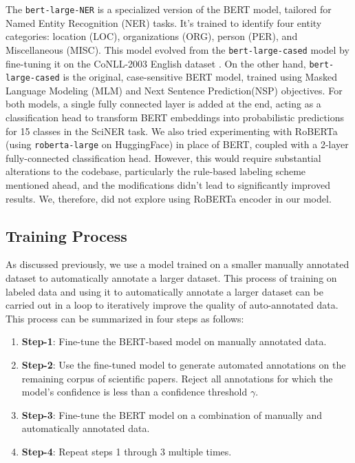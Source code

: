 \documentclass[11pt]{article}
\begin{document}
The \texttt{bert-large-NER} is a specialized version of the BERT model, tailored for Named Entity Recognition (NER) tasks. It's trained to identify four entity categories: location (LOC), organizations (ORG), person (PER), and Miscellaneous (MISC). This model evolved from the \texttt{bert-large-cased} model by fine-tuning it on the CoNLL-2003 English dataset \cite{connl2023}. On the other hand, \texttt{bert-large-cased} is the original, case-sensitive BERT model, trained using Masked Language Modeling (MLM) and Next Sentence Prediction(NSP) objectives. For both models, a single fully connected layer is added at the end, acting as a classification head to transform BERT embeddings into probabilistic predictions for 15 classes in the SciNER task. We also tried experimenting with RoBERTa (using \texttt{roberta-large} on HuggingFace) in place of BERT, coupled with a 2-layer fully-connected classification head. However, this would require substantial alterations to the codebase, particularly the rule-based labeling scheme mentioned ahead, and the modifications didn't lead to significantly improved results. We, therefore, did not explore using RoBERTa encoder in our model.

\subsection{Training Process}
As discussed previously, we use a model trained on a smaller manually annotated dataset to automatically annotate a larger dataset. This process of training on labeled data and using it to automatically annotate a larger dataset can be carried out in a loop to iteratively improve the quality of auto-annotated data. This process can be summarized in four steps as follows:
\begin{enumerate}[noitemsep]
    \item \textbf{Step-1}: Fine-tune the BERT-based model on manually annotated data.
    \item \textbf{Step-2}: Use the fine-tuned model to generate automated annotations on the remaining corpus of scientific papers. Reject all annotations for which the model's confidence is less than a confidence threshold $\gamma$.
    \item \textbf{Step-3}: Fine-tune the BERT model on a combination of manually and automatically annotated data.
    \item \textbf{Step-4}: Repeat steps 1 through 3 multiple times.
\end{enumerate}
\end{document}
